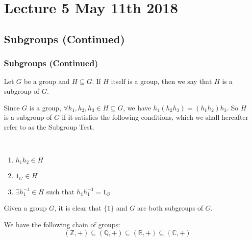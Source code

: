 \chapter{Lecture 5 May 11th 2018}
\label{chp:lecture_5_may_11th_2018}

\section{Subgroups (Continued)}
\label{sec:subgroups_continued}

\subsection{Subgroups (Continued)}
\label{sub:subgroups_continued}

\begin{note}
  Let $G$ be a group and $H \subseteq G$. If $H$ itself is a group, then we say that $H$ is a subgroup of $G$.
\end{note}

\begin{note}
  Since $G$ is a group, $\forall h_1, h_2, h_3 \in H \subseteq G$, we have $h_1 (h_2 h_3) = (h_1 h_2) h_3$. So $H$ is a subgroup of $G$ if it satisfies the following conditions, which we shall hereafter refer to as the Subgroup Test.

\noindent{} \\
  \begin{enumerate}
    \item $h_1 h_2 \in H$
    \item $1_G \in H$
    \item $\exists h_1^{-1} \in H$ such that $h_1 h_1^{-1} = 1_G$
  \end{enumerate}
\end{note}

\begin{eg}
  Given a group $G$, it is clear that $\{1\}$ and $G$ are both subgroups of $G$.
\end{eg}

\begin{eg}
  We have the following chain of groups:
  \begin{equation*}
    (\mathbb{Z}, +) \subseteq (\mathbb{Q}, +) \subseteq (\mathbb{R}, +) \subseteq (\mathbb{C}, +)
  \end{equation*}
\end{eg}

